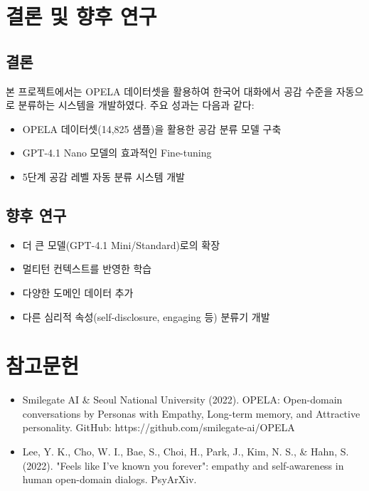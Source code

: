 \documentclass[12pt, a4paper]{article}
\begin{document}
\section{결론 및 향후 연구}

\subsection{결론}
본 프로젝트에서는 OPELA 데이터셋을 활용하여 한국어 대화에서 공감 수준을 자동으로 분류하는 
시스템을 개발하였다. 주요 성과는 다음과 같다:

\begin{itemize}
    \item OPELA 데이터셋(14,825 샘플)을 활용한 공감 분류 모델 구축
    \item GPT-4.1 Nano 모델의 효과적인 Fine-tuning
    \item 5단계 공감 레벨 자동 분류 시스템 개발
\end{itemize}

\subsection{향후 연구}
\begin{itemize}
    \item 더 큰 모델(GPT-4.1 Mini/Standard)로의 확장
    \item 멀티턴 컨텍스트를 반영한 학습
    \item 다양한 도메인 데이터 추가
    \item 다른 심리적 속성(self-disclosure, engaging 등) 분류기 개발
\end{itemize}

\section{참고문헌}

\begin{itemize}
    \item Smilegate AI \& Seoul National University (2022). OPELA: Open-domain conversations by Personas with Empathy, Long-term memory, and Attractive personality. GitHub: https://github.com/smilegate-ai/OPELA
    \item Lee, Y. K., Cho, W. I., Bae, S., Choi, H., Park, J., Kim, N. S., \& Hahn, S. (2022). "Feels like I've known you forever": empathy and self-awareness in human open-domain dialogs. PsyArXiv.
\end{itemize}
\end{document}
